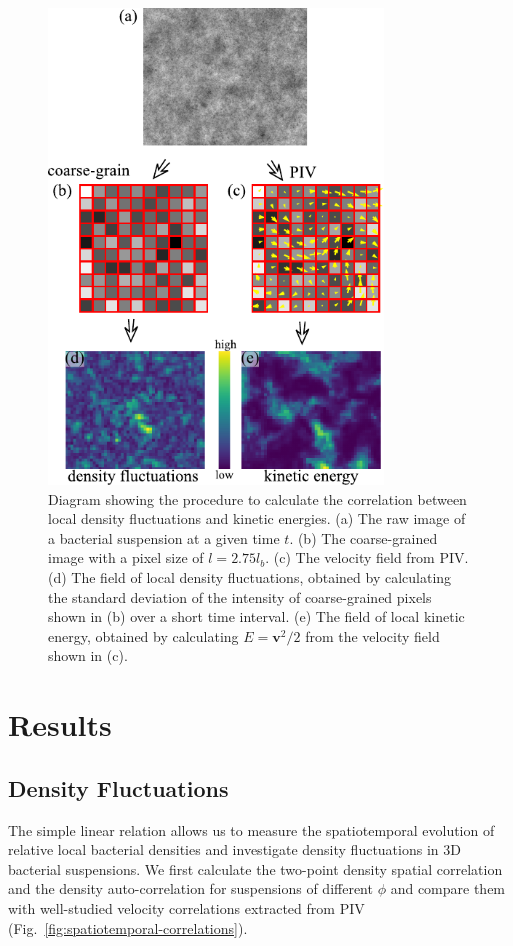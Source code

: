 \begin{figure}[!]
	\begin{center}
		\includegraphics[width=3.5in]{Figs/5-GNF/local-correlation.pdf}
		\caption[Local Correlation between Density Fluctuations and Kinetic Energies]
		{
			Diagram showing the procedure to calculate the correlation between local density fluctuations and kinetic energies. (a) The raw image of a bacterial suspension at a given time $t$. (b) The coarse-grained image with a pixel size of $l=2.75l_b$. (c) The velocity field from PIV. (d) The field of local density fluctuations, obtained by calculating the standard deviation of the intensity of coarse-grained pixels shown in (b) over a short time interval. (e) The field of local kinetic energy, obtained by calculating $E = \bm{v}^2/2$ from the velocity field shown in (c).
 		}
		\label{fig:coupling-calculation}
	\end{center}
\end{figure}


\section{Results}
\subsection{Density Fluctuations}

The simple linear relation allows us to measure the spatiotemporal evolution of relative local bacterial densities and investigate density fluctuations in 3D bacterial suspensions. We first calculate the two-point density spatial correlation and the density auto-correlation for suspensions of different $\phi$ and compare them with well-studied velocity correlations extracted from PIV (Fig.~\ref{fig:spatiotemporal-correlations}).

